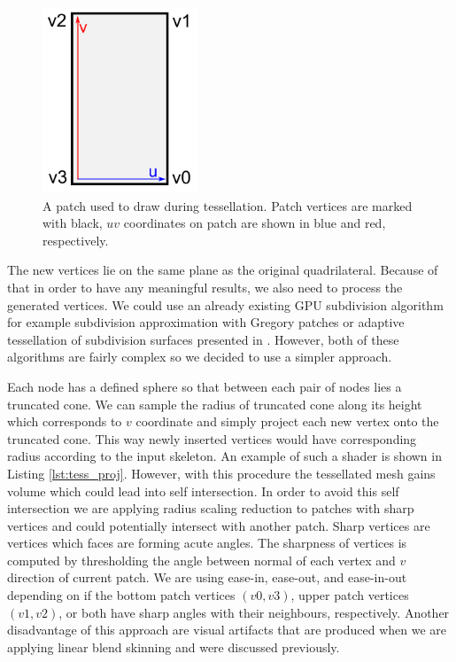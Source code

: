 \begin{figure}[h]
    \centering
    \includegraphics[height=15em]{images/tess_patch}
    \caption[Tessellation patch]{A patch used to draw during tessellation. Patch vertices are marked with black, $uv$ coordinates on patch are shown in blue and red, respectively.}
    \label{fig:tess_patch}
\end{figure}

The new vertices lie on the same plane as the original quadrilateral.
Because of that in order to have any meaningful results, we also need to process the generated vertices.
We could use an already existing GPU subdivision algorithm for example subdivision approximation with Gregory patches \cite{gregory_patch} or adaptive tessellation of subdivision surfaces presented in \cite{gpu_gems_2}.
However, both of these algorithms are fairly complex so we decided to use a simpler approach.

Each node has a defined sphere so that between each pair of nodes lies a truncated cone.
We can sample the radius of truncated cone along its height which corresponds to $v$ coordinate and simply project each new vertex onto the truncated cone.
This way newly inserted vertices would have corresponding radius according to the input skeleton.
An example of such a shader is shown in Listing \ref{lst:tess_proj}.
However, with this procedure the tessellated mesh gains volume which could lead into self intersection.
In order to avoid this self intersection we are applying radius scaling reduction to patches with sharp vertices and could potentially intersect with another patch.
Sharp vertices are vertices which faces are forming acute angles.
The sharpness of vertices is computed by thresholding the angle between normal of each vertex and $v$ direction of current patch.
We are using ease-in, ease-out, and ease-in-out depending on if the bottom patch vertices $(v0, v3)$, upper patch vertices $(v1, v2)$, or both have sharp angles with their neighbours, respectively.
Another disadvantage of this approach are visual artifacts that are produced when we are applying linear blend skinning and were discussed previously.

